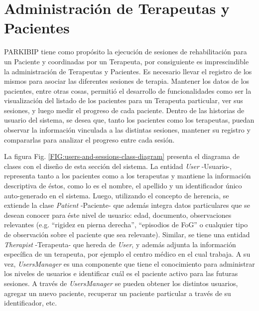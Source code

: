 \section{Administración de Terapeutas y Pacientes}

PARKIBIP tiene como propósito la ejecución de sesiones de rehabilitación para un Paciente y coordinadas por un Terapeuta, por consiguiente es imprescindible la administración de Terapeutas y Pacientes. Es necesario llevar el registro de los mismos para asociar las diferentes sesiones de terapia. Mantener los datos de los pacientes, entre otras cosas, permitió el desarrollo de funcionalidades como ser la visualización del listado de los pacientes para un Terapeuta particular, ver sus sesiones, y luego medir el progreso de cada paciente. Dentro de las historias de usuario del sistema, se desea que, tanto los pacientes como los terapeutas, puedan observar la información vinculada a las distintas sesiones, mantener su registro y compararlas para analizar el progreso entre cada sesión. 

La figura Fig. \ref{FIG:users-and-sessions-class-diagram} presenta el diagrama de clases con el diseño de esta sección del sistema. La entidad \textit{User} -Usuario-, representa tanto a los pacientes como a los terapeutas y mantiene la información descriptiva de éstos, como lo es el nombre, el apellido y un identificador único auto-generado en el sistema. Luego, utilizando el concepto de herencia, se extiende la clase \textit{Patient} -Paciente- que además integra datos particulares que se desean conocer para éste nivel de usuario: edad, documento, observaciones relevantes (e.g. ``rigidez en pierna derecha'', ``episodios de FoG'' o cualquier tipo de observación sobre el paciente que sea relevante). Similar, se tiene una entidad \textit{Therapist} -Terapeuta- que hereda de \textit{User}, y además adjunta la información específica de un terapeuta, por ejemplo el centro médico en el cual trabaja. A su vez, \textit{UsersManager} es una componente que tiene el conocimiento para administrar los niveles de usuarios e identificar cuál es el paciente activo para las futuras sesiones. A través de \textit{UsersManager} se pueden obtener los distintos usuarios, agregar un nuevo paciente, recuperar un paciente particular a través de su identificador, etc. 

